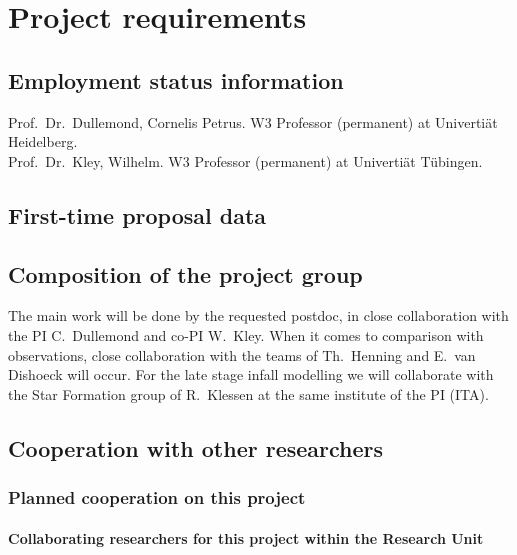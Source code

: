 \documentclass[10pt,fleqn,twoside]{article}
\begin{document}
\section{Project requirements}
\renewcommand{\leftmark}{\sc Project requirements}

\subsection{Employment status information}
Prof.~Dr.~Dullemond, Cornelis Petrus.
W3 Professor (permanent) at Univerti\"at Heidelberg.\\
Prof.~Dr.~Kley, Wilhelm.
W3 Professor (permanent) at Univerti\"at T\"ubingen.


\subsection{First-time proposal data}

\subsection{Composition of the project group}

The main work will be done by the requested postdoc, in close collaboration
with the PI C.~Dullemond and co-PI W.~Kley. When it comes to comparison with
observations, close collaboration with the teams of Th.~Henning and E.~van
Dishoeck will occur. For the late stage infall modelling we will collaborate
with the Star Formation group of R.~Klessen at the same institute of the PI
(ITA). 

\subsection{Cooperation with other researchers}

\subsubsection{Planned cooperation on this project}

\paragraph{Collaborating researchers for this project within the
  Research Unit}
\end{document}
